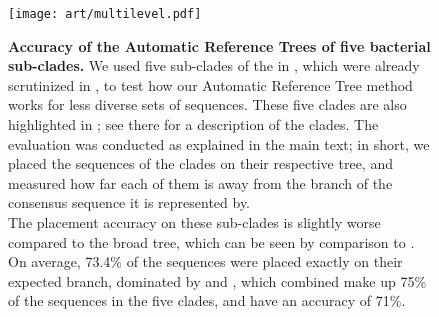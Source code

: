 
\begin{figure}[hpbt]
    \centering
    \texttt{[image: art/multilevel.pdf]}
    \begin{subfigure}{0pt}
        \label{fig:multilevel:sub:edge_unconstr}
    \end{subfigure}
    \begin{subfigure}{0pt}
        \label{fig:multilevel:sub:edge_constr}
    \end{subfigure}
    \begin{subfigure}{0pt}
        \label{fig:multilevel:sub:branch_unconstr}
    \end{subfigure}
    \begin{subfigure}{0pt}
        \label{fig:multilevel:sub:branch_constr}
    \end{subfigure}
    \caption[Accuracy of the Automatic Reference Trees of five bacterial sub-clades]{
        \textbf{Accuracy of the Automatic Reference Trees of five bacterial sub-clades.}
        We used five sub-clades of the  in ,
        which were already scrutinized in \citep{Kozlov2016},
        to test how our Automatic Reference Tree method works for less diverse sets of sequences.
        These five clades are also highlighted in ;
        see there for a description of the clades.
        The evaluation was conducted as explained in the main text;
        in short, we placed the  sequences of the clades on their respective tree,
        and measured how far each of them is away from the branch of the consensus sequence it is represented by.
        \\
        The placement accuracy on these sub-clades is slightly worse compared to the broad  tree,
        which can be seen by comparison to .
        On average, 73.4\% of the sequences were placed exactly on their expected branch,
        dominated by  and ,
        which combined make up 75\% of the sequences in the five clades, and have an accuracy of 71\%.
}
\end{figure}
